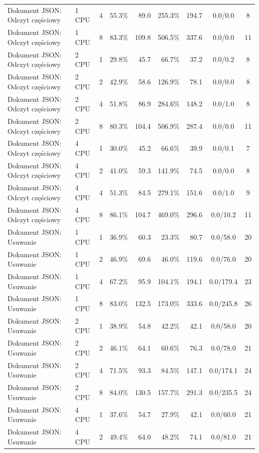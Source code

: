 \begin{table}[ht]
{\begin{tabular}{llcrrrrcc}
Dokument JSON: Odczyt częściowy & 1 CPU & 4 & 55.3\% & 89.0 & 255.3\% & 194.7 & 0.0/0.0 & 8 \\
Dokument JSON: Odczyt częściowy & 1 CPU & 8 & 83.3\% & 109.8 & 506.5\% & 337.6 & 0.0/0.0 & 11 \\
Dokument JSON: Odczyt częściowy & 2 CPU & 1 & 29.8\% & 45.7 & 66.7\% & 37.2 & 0.0/0.2 & 8 \\
Dokument JSON: Odczyt częściowy & 2 CPU & 2 & 42.9\% & 58.6 & 126.9\% & 78.1 & 0.0/0.0 & 8 \\
Dokument JSON: Odczyt częściowy & 2 CPU & 4 & 51.8\% & 86.9 & 284.6\% & 148.2 & 0.0/1.0 & 8 \\
Dokument JSON: Odczyt częściowy & 2 CPU & 8 & 80.3\% & 104.4 & 506.9\% & 287.4 & 0.0/0.0 & 11 \\
Dokument JSON: Odczyt częściowy & 4 CPU & 1 & 30.0\% & 45.2 & 66.6\% & 39.9 & 0.0/0.1 & 7 \\
Dokument JSON: Odczyt częściowy & 4 CPU & 2 & 41.0\% & 59.3 & 141.9\% & 74.5 & 0.0/0.0 & 8 \\
Dokument JSON: Odczyt częściowy & 4 CPU & 4 & 51.3\% & 84.5 & 279.1\% & 151.6 & 0.0/1.0 & 9 \\
Dokument JSON: Odczyt częściowy & 4 CPU & 8 & 86.1\% & 104.7 & 469.0\% & 296.6 & 0.0/10.2 & 11 \\
Dokument JSON: Usuwanie & 1 CPU & 1 & 36.9\% & 60.3 & 23.3\% & 80.7 & 0.0/58.0 & 20 \\
Dokument JSON: Usuwanie & 1 CPU & 2 & 46.9\% & 69.6 & 46.0\% & 119.6 & 0.0/76.0 & 20 \\
Dokument JSON: Usuwanie & 1 CPU & 4 & 67.2\% & 95.9 & 104.1\% & 194.1 & 0.0/179.4 & 23 \\
Dokument JSON: Usuwanie & 1 CPU & 8 & 83.0\% & 132.5 & 173.0\% & 333.6 & 0.0/245.8 & 26 \\
Dokument JSON: Usuwanie & 2 CPU & 1 & 38.9\% & 54.8 & 42.2\% & 42.1 & 0.0/58.0 & 20 \\
Dokument JSON: Usuwanie & 2 CPU & 2 & 46.1\% & 64.1 & 60.6\% & 76.3 & 0.0/78.0 & 21 \\
Dokument JSON: Usuwanie & 2 CPU & 4 & 71.5\% & 93.3 & 84.5\% & 147.1 & 0.0/174.1 & 24 \\
Dokument JSON: Usuwanie & 2 CPU & 8 & 84.0\% & 130.5 & 157.7\% & 291.3 & 0.0/235.5 & 24 \\
Dokument JSON: Usuwanie & 4 CPU & 1 & 37.6\% & 54.7 & 27.9\% & 42.1 & 0.0/60.0 & 21 \\
Dokument JSON: Usuwanie & 4 CPU & 2 & 49.4\% & 64.0 & 48.2\% & 74.1 & 0.0/81.0 & 21 \\

\end{tabular}}
\end{table}
